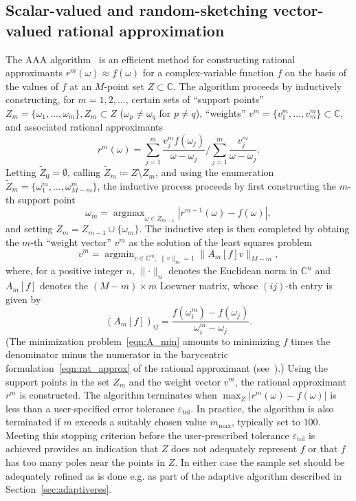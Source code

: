 \documentclass[11pt]{article}
\theoremstyle{plain}
\theoremstyle{remark}
\DeclareMathOperator*{\argmax}{argmax}
\DeclareMathOperator*{\argmin}{argmin}
\begin{document}
\subsection{Scalar-valued and random-sketching vector-valued rational approximation}\label{sec:AAA}
The AAA algorithm~\cite{AAA} is an efficient method for constructing
rational approximants $r^m(\omega) \approx f(\omega)$ for a
complex-variable function $f$ on the basis of the values of $f$ at an
$M$-point set $Z \subset \mathbb{C}$. The algorithm proceeds by
inductively constructing, for $m=1,2,\dots$, certain sets of ``support
points'' $Z_{m} = \{\omega_1,\ldots,\omega_{m}\}, Z_{m} \subset{Z}$
($\omega_p\ne \omega_q$ for $p\ne q$),  ``weights''
$v^{m} = \{v^{m}_1,\ldots,v^{m}_m\}\subset \mathbb{C}$, and associated
rational approximants
\begin{equation}\label{eqn:rat_approx}
    r^m(\omega) = \sum_{j=1}^m \frac{v^m_j f(\omega_j)}{\omega - \omega_j} \bigg/   \sum_{j=1}^{m} \frac{v^{m}_j}{\omega - \omega_j}.
  \end{equation}
Letting $\widetilde{Z}_0=\emptyset$, calling
$\widetilde{Z}_m \coloneq Z \setminus Z_{m}$, and using the enumeration
$\widetilde{Z}_m = \{\omega^m_1,\ldots,\omega^m_{M-m}\}$,
the inductive process proceeds by first constructing the $m$-th support point
\begin{equation*}\label{eqn:support_max}
 \omega_{m} =  \argmax_{\omega\in \widetilde{Z}_{m-1}} |r^{m-1}(\omega) - f(\omega)|,
\end{equation*}
and setting $Z_{m} = Z_{m-1} \cup\{\omega_{m}\}$. The inductive step
is then completed by obtaing the $m$-th ``weight vector'' $v^{m}$ as
the solution of the least squares problem
\begin{equation}\label{eqn:A_min}
    v^{m} =  \argmin_{v\in \mathbb{C}^m,\; \parallel v\parallel_m = 1}\parallel A_{m}[f]v\parallel_{M-m},
\end{equation}
where, for a positive integer $n$, $\parallel\cdot\parallel_n$ denotes the Euclidean norm in $\mathbb{C}^n$ and $A_{m}[f]$ denotes the $(M - m) \times m$ Loewner matrix, whose $(ij)$-th entry is given by
\begin{equation*}
  (A_{m}[f])_{ij} = \frac{f(\omega^m_i) - f(\omega_j)}{\omega^m_i - \omega_j}.
\end{equation*}
(The minimization problem~\eqref{eqn:A_min} amounts to minimizing $f$
times the denominator minus the numerator in the barycentric
formulation~\eqref{eqn:rat_approx} of the rational approximant
(see~\cite[Eq.~3.4]{AAA}).)  Using the support points in the set $Z_m$
and the weight vector $v^m$, the rational approximant $r^m$ is
constructed. The algorithm terminates when
$\max_{Z}|r^{m}(\omega) - f(\omega)|$ is less than a user-specified
error tolerance $\varepsilon_\mathrm{tol}$. In practice, the
algorithm is also terminated if $m$ exceeds a suitably chosen value
$m_\mathrm{max}$, typically set to $100$. Meeting this stopping
criterion before the user-prescribed tolerance
$\varepsilon_\mathrm{tol}$ is achieved provides an indication that $Z$
does not adequately represent $f$ or that $f$ has too many poles near
the points in $Z$. In either case the sample set should be adequately
refined as is done e.g. as part of the adaptive algorithm described in
Section~\ref{sec:adaptiveres}.
\end{document}
